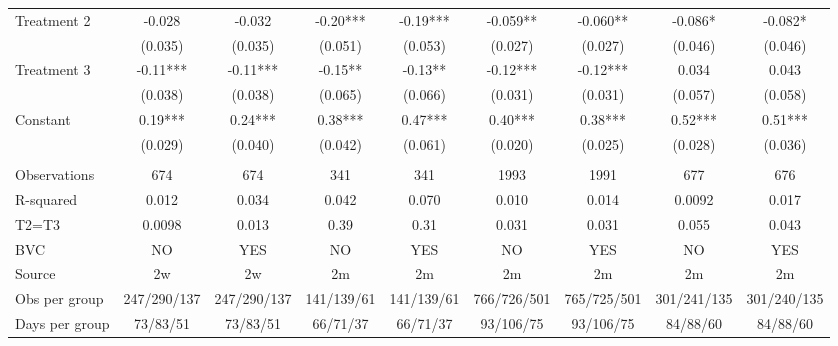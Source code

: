 \begin{tabular}{lcccccccc}
\midrule
\midrule
Treatment 2 & -0.028 & -0.032 & -0.20*** & -0.19*** & -0.059** & -0.060** & -0.086* & -0.082* \\
      & (0.035) & (0.035) & (0.051) & (0.053) & (0.027) & (0.027) & (0.046) & (0.046) \\
Treatment 3 & -0.11*** & -0.11*** & -0.15** & -0.13** & -0.12*** & -0.12*** & 0.034 & 0.043 \\
      & (0.038) & (0.038) & (0.065) & (0.066) & (0.031) & (0.031) & (0.057) & (0.058) \\
Constant  & 0.19*** & 0.24*** & 0.38*** & 0.47*** & 0.40*** & 0.38*** & 0.52*** & 0.51*** \\
      & (0.029) & (0.040) & (0.042) & (0.061) & (0.020) & (0.025) & (0.028) & (0.036) \\
      &       &       &       &       &       &       &       &  \\
Observations & 674   & 674   & 341   & 341   & 1993  & 1991  & 677   & 676 \\
R-squared & 0.012 & 0.034 & 0.042 & 0.070 & 0.010 & 0.014 & 0.0092 & 0.017 \\
T2=T3 & 0.0098 & 0.013 & 0.39  & 0.31  & 0.031 & 0.031 & 0.055 & 0.043 \\
BVC   & NO    & YES   & NO    & YES   & NO    & YES   & NO    & YES \\
Source & 2w    & 2w    & 2m    & 2m    & 2m    & 2m    & 2m    & 2m \\
Obs per group & 247/290/137 & 247/290/137 & 141/139/61 & 141/139/61 & 766/726/501 & 765/725/501 & 301/241/135 & 301/240/135 \\
Days per group & 73/83/51 & 73/83/51 & 66/71/37 & 66/71/37 & 93/106/75 & 93/106/75 & 84/88/60 & 84/88/60 \\
\bottomrule
\bottomrule
\end{tabular}%
